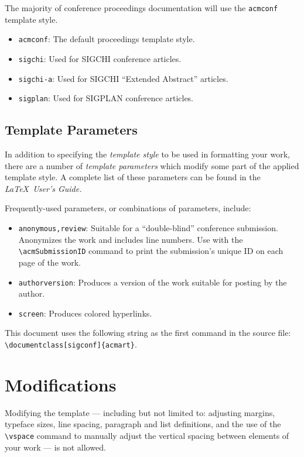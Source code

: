 \documentclass[acmlarge,11pt]{acmart}
\begin{document}
The majority of conference proceedings documentation will use the {\verb|acmconf|} template style.
\begin{itemize}
\item {\verb|acmconf|}: The default proceedings template style.
\item{\verb|sigchi|}: Used for SIGCHI conference articles.
\item{\verb|sigchi-a|}: Used for SIGCHI ``Extended Abstract'' articles.
\item{\verb|sigplan|}: Used for SIGPLAN conference articles.
\end{itemize}

\subsection{Template Parameters}

In addition to specifying the {\itshape template style} to be used in
formatting your work, there are a number of {\itshape template parameters}
which modify some part of the applied template style. A complete list
of these parameters can be found in the {\itshape \LaTeX\ User's Guide.}

Frequently-used parameters, or combinations of parameters, include:
\begin{itemize}
\item {\verb|anonymous,review|}: Suitable for a ``double-blind''
  conference submission. Anonymizes the work and includes line
  numbers. Use with the \verb|\acmSubmissionID| command to print the
  submission's unique ID on each page of the work.
\item{\verb|authorversion|}: Produces a version of the work suitable
  for posting by the author.
\item{\verb|screen|}: Produces colored hyperlinks.
\end{itemize}

This document uses the following string as the first command in the
source file:
\verb|\documentclass[sigconf]{acmart}|.

\section{Modifications}

Modifying the template --- including but not limited to: adjusting
margins, typeface sizes, line spacing, paragraph and list definitions,
and the use of the \verb|\vspace| command to manually adjust the
vertical spacing between elements of your work --- is not allowed.
\end{document}
